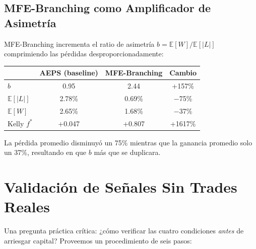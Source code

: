 \documentclass[11pt,a4paper]{article}
\begin{document}
\subsection{MFE-Branching como Amplificador de Asimetría}

MFE-Branching incrementa el ratio de asimetría $b = \mathbb{E}[W] / \mathbb{E}[|L|]$ comprimiendo las pérdidas desproporcionadamente:

\begin{center}
\begin{tabular}{lccc}
\toprule
& AEPS (baseline) & MFE-Branching & Cambio \\
\midrule
$b$ & 0.95 & 2.44 & +157\% \\
$\mathbb{E}[|L|]$ & 2.78\% & 0.69\% & $-$75\% \\
$\mathbb{E}[W]$ & 2.65\% & 1.68\% & $-$37\% \\
Kelly $f^*$ & +0.047 & +0.807 & +1617\% \\
\bottomrule
\end{tabular}
\end{center}

La pérdida promedio disminuyó un 75\% mientras que la ganancia promedio solo un 37\%, resultando en que $b$ más que se duplicara.

\section{Validación de Señales Sin Trades Reales}

Una pregunta práctica crítica: ¿cómo verificar las cuatro condiciones \emph{antes} de arriesgar capital? Proveemos un procedimiento de seis pasos:
\end{document}

